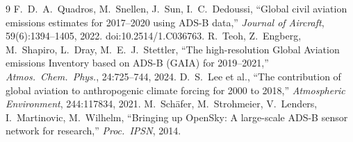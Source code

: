 \documentclass[11pt,a4paper]{article}
\begin{document}
\vspace{-0.3cm}
{\small
\begin{thebibliography}{9}\setlength{\itemsep}{0pt}
 F.~D.~A.~Quadros, M.~Snellen, J.~Sun, I.~C.~Dedoussi, ``Global civil aviation emissions
estimates for 2017--2020 using ADS-B data,'' \emph{Journal of Aircraft}, 59(6):1394--1405, 2022.
doi:10.2514/1.C036763.
 R.~Teoh, Z.~Engberg, M.~Shapiro, L.~Dray, M.~E.~J.~Stettler, ``The high-resolution Global
Aviation emissions Inventory based on ADS-B (GAIA) for 2019--2021,'' \emph{Atmos.\ Chem.\ Phys.}, 24:725--744, 2024.
 D.~S.~Lee et al., ``The contribution of global aviation to anthropogenic climate forcing for
2000 to 2018,'' \emph{Atmospheric Environment}, 244:117834, 2021.
 M.~Sch\"afer, M.~Strohmeier, V.~Lenders, I.~Martinovic, M.~Wilhelm, ``Bringing up OpenSky:
A large-scale ADS-B sensor network for research,'' \emph{Proc.\ IPSN}, 2014.
\end{thebibliography}
}
\end{document}
